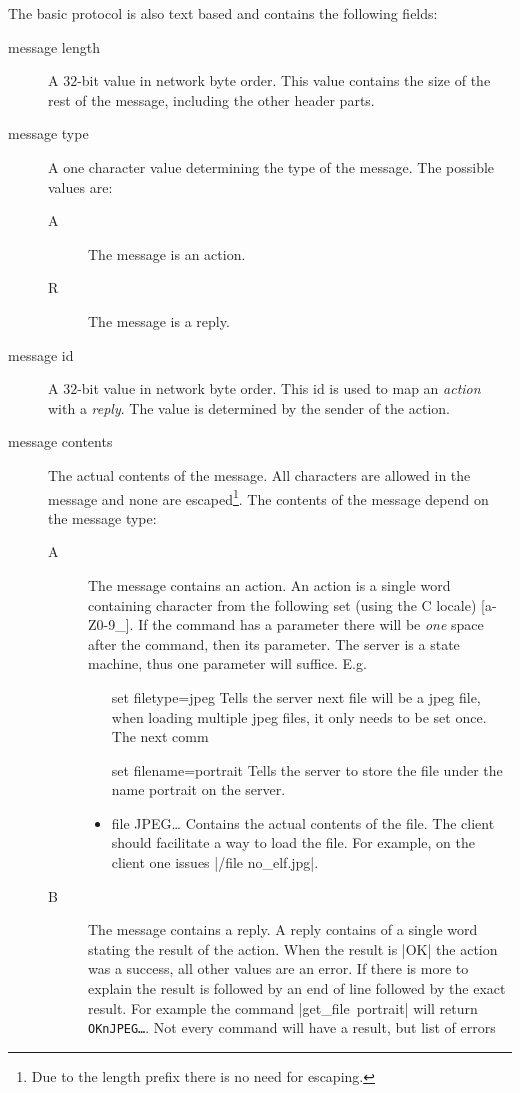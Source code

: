 The basic protocol is also text based and contains the following fields:
\begin{description}
\item[message length]
	A \mbox{$32$-bit} value in network byte order. This value contains the
	size of the rest of the message, including the other header parts.

\item[message type]
	A one character value determining the type of the message. The possible
	values are:
	\begin{description}
	\item[A] The message is an action.
	\item[R] The message is a reply.
	\end{description}

\item[message id]
	A \mbox{$32$-bit} value in network byte order. This id is used to map an
	\emph{action} with a \emph{reply}. The value is determined by the sender
	of the action.

\item[message contents]
	The actual contents of the message. All characters are allowed in the
	message and none are escaped\footnote{Due to the length prefix there is
	no need for escaping.}. The contents of the message depend on the
	message type:
	\begin{description}
	\item[A]
		The message contains an action. An action is a single word
		containing character from the following set (using the C locale)
		[a-Z0-9\_]. If the command has a parameter there will be \emph{one}
		space after the command, then its parameter. The server is a state
		machine, thus one parameter will suffice. E.g.
		\begin{itemize}%
		\item[set filetype=jpeg]
			Tells the server next file will be a jpeg file,
			when loading multiple jpeg files, it only needs to be set once.
			The next comm
		\item[set filename=portrait]
			Tells the server to store the file under the name portrait on
			the server.
		\item file JPEG\ldots
			Contains the actual contents of the file. The client should
			facilitate a way to load the file. For example, on the client
			one issues \command|/file no_elf.jpg|.
		\end{itemize}
	\item[B]
		The message contains a reply. A reply contains of a single word
		stating the result of the action. When the result is \command|OK|
		the action was a success, all other values are an error. If there is
		more to explain the result is followed by an end of line followed by
		the exact result. For example the command
		\mbox{\command|get_file portrait|} will return
		\mbox{\texttt{OK\\nJPEG\ldots}}. Not every command will have a
		result, but list of errors
	\end{description}


\end{description}


